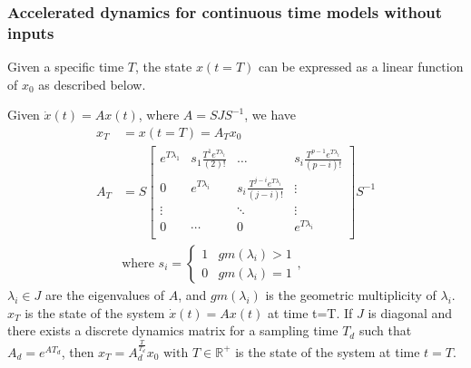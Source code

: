 \documentclass[sigconf]{llncs}
\newcommand{\mat}[1]{{#1}}
\renewcommand{\vec}[1]{{#1}}
\begin{document}
 \subsubsection{Accelerated dynamics for continuous time models without inputs}\label{sec:cont_acc_no_inputs}
 Given a specific time $T$, the state $\vec{x}(t=T)$ can be expressed as a linear function of $\vec{x}_0$ as described below.
 
 \begin{lemma}
 Given $\dot{\vec{x}}(t)=\mat{A}\vec{x}(t)$, where $\mat{A}=\mat{S}\mat{J}\mat{S}^{-1}$, we have
 \begin{align}
 \vec{x}_T&=\vec{x}(t=T)=\mat{A}_{T}\vec{x}_0\\
 \mat{A}_{T}&= \mat{S}
 \left [ \begin{array}{cccc}
 e^{T\lambda_1}  & s_1\frac{T^{1}e^{T\lambda_i}}{(2)!} & \hdots  & s_i\frac{T^{p-1}e^{T\lambda_i}}{(p-i)!} \\
0 & e^{T\lambda_i}  & s_i\frac{T^{j-i}e^{T\lambda_i}}{(j-i)!} & \vdots \\
\vdots & & \ddots & \vdots \\
0 & \cdots & 0  &e^{T\lambda_i} \\
\end{array} \right ]
 \mat{S}^{-1}
 \label{eq:continuous_tube_dyn}\\
 &\text{where } s_i=\left\{\begin{array}{cc}1&gm(\lambda_i)>1\\0&gm(\lambda_i)=1\end{array}\right.,\nonumber
 \end{align}
$\lambda_i \in \mat{J}$ are the eigenvalues of $\mat{A}$, and $gm(\lambda_i)$ is the geometric multiplicity of $\lambda_i$.  
$\vec{x}_T$ is the state of the system $\dot{\vec{x}}(t)=\mat{A}\vec{x}(t)$ at time t=T.
  If $\mat{J}$ is diagonal and there exists a discrete dynamics matrix for a sampling time $T_d$ such that $A_d=e^{\mat{A} T_d}$, then $\vec{x}_T=A_d^{\frac{T}{T_d}}\vec{x}_0 \text{ with } T \in \mathbb{R}^+$ is the state of the system at time $t=T$.
 \end{lemma}
\end{document}
